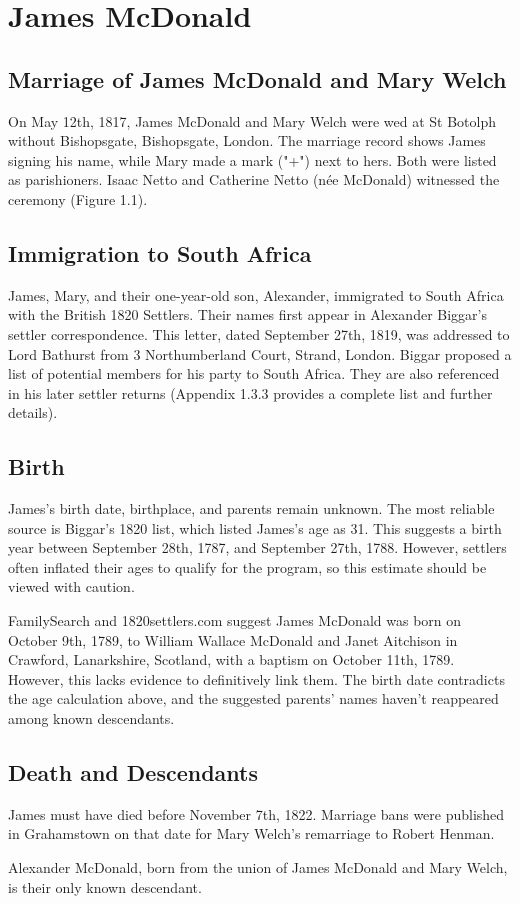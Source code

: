 \chapter{James McDonald}

\section{Marriage of James McDonald and Mary Welch}

On May 12th, 1817, James McDonald and Mary Welch were wed at St Botolph without Bishopsgate, Bishopsgate, London. The marriage record shows James signing his name, while Mary made a mark ("+") next to hers. Both were listed as parishioners. Isaac Netto and Catherine Netto (née McDonald) witnessed the ceremony (Figure 1.1).

\section{Immigration to South Africa}

James, Mary, and their one-year-old son, Alexander, immigrated to South Africa with the British 1820 Settlers. Their names first appear in Alexander Biggar's settler correspondence. This letter, dated September 27th, 1819, was addressed to Lord Bathurst from 3 Northumberland Court, Strand, London. Biggar proposed a list of potential members for his party to South Africa. They are also referenced in his later settler returns (Appendix 1.3.3 provides a complete list and further details).

\section{Birth}

James's birth date, birthplace, and parents remain unknown. The most reliable source is Biggar's 1820 list, which listed James's age as 31. This suggests a birth year between September 28th, 1787, and September 27th, 1788. However, settlers often inflated their ages to qualify for the program, so this estimate should be viewed with caution.

FamilySearch and 1820settlers.com suggest James McDonald was born on October 9th, 1789, to William Wallace McDonald and Janet Aitchison in Crawford, Lanarkshire, Scotland, with a baptism on October 11th, 1789. However, this lacks evidence to definitively link them. The birth date contradicts the age calculation above, and the suggested parents' names haven't reappeared among known descendants.

\section{Death and Descendants}

James must have died before November 7th, 1822. Marriage bans were published in Grahamstown on that date for Mary Welch's remarriage to Robert Henman.

Alexander McDonald, born from the union of James McDonald and Mary Welch, is their only known descendant.